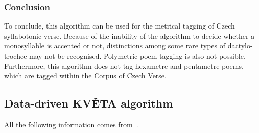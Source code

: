 \subsubsection{Conclusion}
To conclude, this algorithm can be used for the metrical tagging of Czech syllabotonic verse. Because of the inability of the algorithm to decide whether a monosyllable is accented or not, distinctions among some rare types of dactylo-trochee may not be recognised. Polymetric poem tagging is also not possible. Furthermore, this algorithm does not tag hexametre and pentametre poems, which are tagged within the Corpus of Czech Verse.

\subsection{Data-driven KVĚTA algorithm}
All the following information comes from~\cite{KVETA}.

